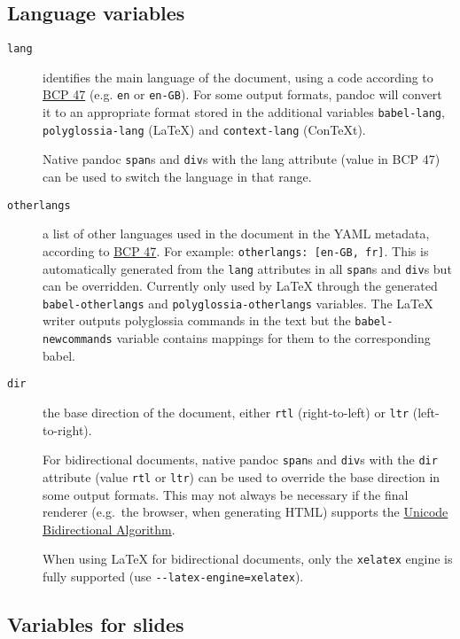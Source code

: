 \documentclass[]{article}
\begin{document}
\subsection{Language variables}\label{language-variables}

\begin{description}
\item[\texttt{lang}]
identifies the main language of the document, using a code according to
\href{https://tools.ietf.org/html/bcp47}{BCP 47} (e.g. \texttt{en} or
\texttt{en-GB}). For some output formats, pandoc will convert it to an
appropriate format stored in the additional variables
\texttt{babel-lang}, \texttt{polyglossia-lang} (LaTeX) and
\texttt{context-lang} (ConTeXt).

Native pandoc \texttt{span}s and \texttt{div}s with the lang attribute
(value in BCP 47) can be used to switch the language in that range.
\item[\texttt{otherlangs}]
a list of other languages used in the document in the YAML metadata,
according to \href{https://tools.ietf.org/html/bcp47}{BCP 47}. For
example: \texttt{otherlangs:\ {[}en-GB,\ fr{]}}. This is automatically
generated from the \texttt{lang} attributes in all \texttt{span}s and
\texttt{div}s but can be overridden. Currently only used by LaTeX
through the generated \texttt{babel-otherlangs} and
\texttt{polyglossia-otherlangs} variables. The LaTeX writer outputs
polyglossia commands in the text but the \texttt{babel-newcommands}
variable contains mappings for them to the corresponding babel.
\item[\texttt{dir}]
the base direction of the document, either \texttt{rtl} (right-to-left)
or \texttt{ltr} (left-to-right).

For bidirectional documents, native pandoc \texttt{span}s and
\texttt{div}s with the \texttt{dir} attribute (value \texttt{rtl} or
\texttt{ltr}) can be used to override the base direction in some output
formats. This may not always be necessary if the final renderer
(e.g.~the browser, when generating HTML) supports the
\href{http://www.w3.org/International/articles/inline-bidi-markup/uba-basics}{Unicode
Bidirectional Algorithm}.

When using LaTeX for bidirectional documents, only the \texttt{xelatex}
engine is fully supported (use \texttt{-\/-latex-engine=xelatex}).
\end{description}

\hypertarget{variables-for-slides}{\subsection{Variables for
slides}\label{variables-for-slides}}
\end{document}
